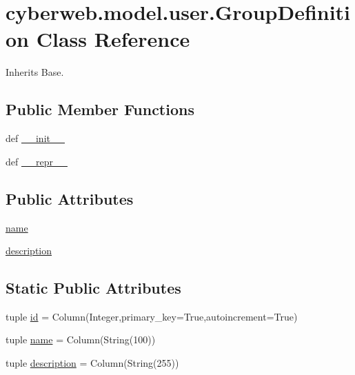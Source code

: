\hypertarget{classcyberweb_1_1model_1_1user_1_1_group_definition}{\section{cyberweb.\-model.\-user.\-Group\-Definition \-Class \-Reference}
\label{classcyberweb_1_1model_1_1user_1_1_group_definition}
}


\-Inherits \-Base.

\subsection*{\-Public \-Member \-Functions}
\begin{DoxyCompactItemize}
\item 
def \hyperlink{classcyberweb_1_1model_1_1user_1_1_group_definition_a2135864119f99686b20bb289e746df82}{\-\_\-\-\_\-init\-\_\-\-\_\-}
\item 
def \hyperlink{classcyberweb_1_1model_1_1user_1_1_group_definition_ac2ca4a07352c0da7e8fea985d9b79d29}{\-\_\-\-\_\-repr\-\_\-\-\_\-}
\end{DoxyCompactItemize}
\subsection*{\-Public \-Attributes}
\begin{DoxyCompactItemize}
\item 
\hyperlink{classcyberweb_1_1model_1_1user_1_1_group_definition_aa27a8e609783cbf25875031f42f1f11c}{name}
\item 
\hyperlink{classcyberweb_1_1model_1_1user_1_1_group_definition_aecb643fa536369ac80c1735c0bb2a083}{description}
\end{DoxyCompactItemize}
\subsection*{\-Static \-Public \-Attributes}
\begin{DoxyCompactItemize}
\item 
tuple \hyperlink{classcyberweb_1_1model_1_1user_1_1_group_definition_ab01effb2572c8d5439bca6449f9e8d85}{id} = \-Column(\-Integer,primary\-\_\-key=\-True,autoincrement=\-True)
\item 
tuple \hyperlink{classcyberweb_1_1model_1_1user_1_1_group_definition_ab9e494eaf9d8768c030de6dc6e537504}{name} = \-Column(\-String(100))
\item 
tuple \hyperlink{classcyberweb_1_1model_1_1user_1_1_group_definition_a6a22f186f478c8b6ea48396a02e1c39a}{description} = \-Column(\-String(255))
\end{DoxyCompactItemize}



